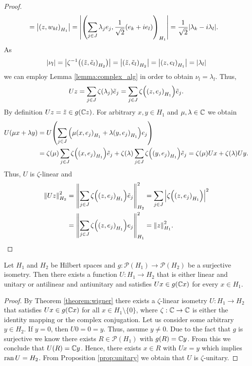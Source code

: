 \begin{proof}
\begin{align*}
		&= \vbraces{\pbraces{z, w_{kl}}_{H_1}} = \vbraces{\pbraces{\sum_{j \in J} \lambda_j e_j, \frac{1}{\sqrt{2}}(e_k + ie_l)}_{H_1}} = \frac{1}{\sqrt{2}} \vbraces{\lambda_k - i \lambda_l}.
	\end{align*}
	As
	\begin{align*}
		\vbraces{\nu_l} = \vbraces{\zeta^{-1}\pbraces{\pbraces{\tilde{z}, \tilde{e}_l}_{H_2}}} = \vbraces{\pbraces{\tilde{z}, \tilde{e}_l}_{H_2}} = \vbraces{\pbraces{z, e_l}_{H_1}} = \vbraces{\lambda_l}
	\end{align*}
	we can employ Lemma \ref{lemma:complex_alg} in order to obtain $\nu_l = \lambda_l$. Thus, 
	\begin{align*}
		Uz = \sum_{j \in J} \zeta(\lambda_j) \tilde{e}_j = \sum_{j \in J} \zeta\pbraces{\pbraces{z, e_j}_{H_1}}\tilde{e}_j.
	\end{align*}
	By definition $Uz = \tilde{z} \in g(\C z)$. For arbitrary $x,y \in H_1$ and $\mu, \lambda \in \C$ we obtain
	\begin{align*}
		U(\mu x + \lambda y) &= U \pbraces{\sum_{j \in J} \pbraces{\mu \pbraces{x, e_j}_{H_1} + \lambda \pbraces{y, e_j}_{H_1}} e_j} \\
		&= \zeta(\mu) \sum_{j \in J} \zeta\pbraces{\pbraces{x, e_j}_{H_1}} \tilde{e}_j + \zeta(\lambda) \sum_{j \in J} \zeta\pbraces{\pbraces{y, e_j}_{H_1}} \tilde{e}_j = \zeta(\mu) Ux + \zeta\pbraces{\lambda} Uy.
	\end{align*}
	Thus, $U$ is $\zeta$-linear and 
	\begin{align*}
		\norm[H_2]{Uz}^2 &= \norm[H_2]{\sum_{j \in J} \zeta\pbraces{\pbraces{z, e_j}_{H_1}} \tilde{e}_j}^2 = \sum_{j \in J} \vbraces{\zeta\pbraces{\pbraces{z, e_j}_{H_1}}}^2  \\
		&= \norm[H_1]{\sum_{j \in J} \zeta\pbraces{\pbraces{z, e_j}_{H_1}} e_j}^2 = \norm[H_1]{z}^2.
	\end{align*}
\end{proof}


\begin{corollary}
	Let $H_1$ and $H_2$ be Hilbert spaces and $g: \mathcal{P}(H_1) \to \mathcal{P}(H_2)$ be a surjective isometry. Then there exists a function $U: H_1 \to H_2$ that is either linear and unitary or antilinear and antiunitary and satisfies $Ux \in g(\C x)$ for every $x \in H_1$.
\end{corollary}

\begin{proof}
	By Theorem \ref{theorem:wigner} there exists a $\zeta$-linear isometry $U: H_1 \to H_2$ that satisfies $Ux \in g\pbraces{\C x}$ for all $x \in H_1 \setminus \{0\}$, where $\zeta:\C \to \C$ is either the identity mapping or the complex conjugation. 
	Let us consider some arbitrary $y \in H_2$. If $y = 0$, then $U0 = 0 = y$. Thus, assume $y \neq 0$. Due to the fact that $g$ is surjective we know there exists $R \in \mathcal{P}(H_1)$ with $g(R) = \C y$. From this we conclude that $U(R) = \C y$. Hence, there exists $x \in R$ with $Ux = y$ which implies $\ran U = H_2$. From Proposition \ref{prop:unitary} we obtain that $U$ is $\zeta$-unitary.
\end{proof}